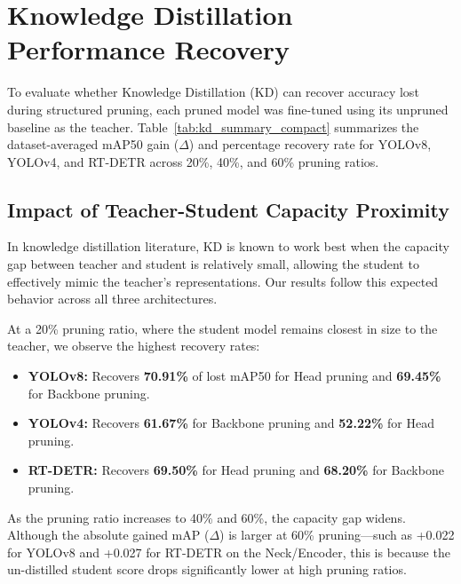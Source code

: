 \section{Knowledge Distillation Performance Recovery}
\label{sec:kd_results}

To evaluate whether Knowledge Distillation (KD) can recover accuracy lost during structured pruning, each pruned model was fine-tuned using its unpruned baseline as the teacher. Table~\ref{tab:kd_summary_compact} summarizes the dataset-averaged mAP50 gain ($\Delta$) and percentage recovery rate for YOLOv8, YOLOv4, and RT-DETR across 20\%, 40\%, and 60\% pruning ratios.

\begin{table}[htbp]
\centering
\caption[Dataset-averaged Knowledge Distillation performance restoration across models and pruning ratios]{\textbf{Dataset-averaged Knowledge Distillation performance restoration ($\Delta\mathrm{mAP}_{50}$ gain and recovery rate \%) across YOLOv8, YOLOv4, and RT-DETR across all pruning ratios.}}
\label{tab:kd_summary_compact}
\resizebox{\linewidth}{!}{
  
}
\end{table}

\subsection{Impact of Teacher-Student Capacity Proximity}
In knowledge distillation literature, KD is known to work best when the capacity gap between teacher and student is relatively small, allowing the student to effectively mimic the teacher's representations. Our results follow this expected behavior across all three architectures.

At a 20\% pruning ratio, where the student model remains closest in size to the teacher, we observe the highest recovery rates:
\begin{itemize}
    \item \textbf{YOLOv8:} Recovers \textbf{70.91\%} of lost mAP50 for Head pruning and \textbf{69.45\%} for Backbone pruning.
    \item \textbf{YOLOv4:} Recovers \textbf{61.67\%} for Backbone pruning and \textbf{52.22\%} for Head pruning.
    \item \textbf{RT-DETR:} Recovers \textbf{69.50\%} for Head pruning and \textbf{68.20\%} for Backbone pruning.
\end{itemize}

As the pruning ratio increases to 40\% and 60\%, the capacity gap widens. Although the absolute gained mAP ($\Delta$) is larger at 60\% pruning---such as +0.022 for YOLOv8 and +0.027 for RT-DETR on the Neck/Encoder, this is because the un-distilled student score drops significantly lower at high pruning ratios. 

